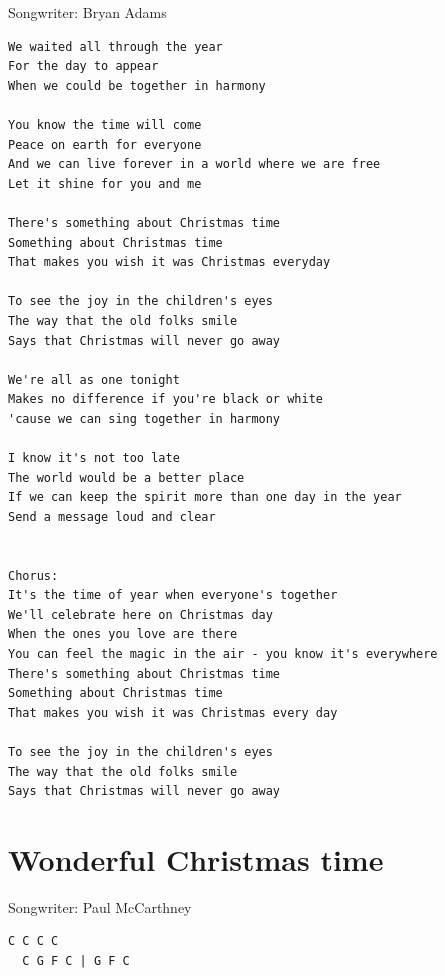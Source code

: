 \documentclass[
]{article}
\begin{document}
Songwriter: Bryan Adams

\begin{verbatim}
We waited all through the year
For the day to appear
When we could be together in harmony

You know the time will come
Peace on earth for everyone
And we can live forever in a world where we are free
Let it shine for you and me

There's something about Christmas time
Something about Christmas time
That makes you wish it was Christmas everyday

To see the joy in the children's eyes
The way that the old folks smile
Says that Christmas will never go away

We're all as one tonight
Makes no difference if you're black or white
'cause we can sing together in harmony

I know it's not too late
The world would be a better place
If we can keep the spirit more than one day in the year
Send a message loud and clear

  
Chorus:
It's the time of year when everyone's together
We'll celebrate here on Christmas day
When the ones you love are there
You can feel the magic in the air - you know it's everywhere
There's something about Christmas time
Something about Christmas time
That makes you wish it was Christmas every day

To see the joy in the children's eyes
The way that the old folks smile
Says that Christmas will never go away

\end{verbatim}

\hypertarget{wonderful-christmas-time}{%
\section{Wonderful Christmas time}\label{wonderful-christmas-time}}

Songwriter: Paul McCarthney

\begin{verbatim}
C C C C 
  C G F C | G F C 
\end{verbatim}
\end{document}
